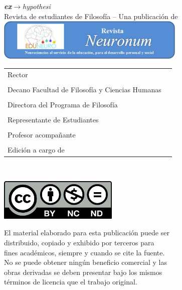 {\small

\begin{center}
	{\Huge\textit{\textcolor{ehAzul1}{\textbf{ex}}\textcolor{ehAzul2}{$\rightarrow$}\textcolor{ehAzul1}{\vspace{-0.4cm}hypothesi}}}\\[0.5cm]
	Revista de estudiantes de Filosofía -- Una publicación de
	\includegraphics[width=9.021cm,height=1.984cm]{img/logo-neuronum.png}
\end{center}

\begin{longtable}[]{@{}ll@{}}
	\toprule[0.5pt]
	\midrule[0.5pt]
	\endhead
	Rector & \rector{}\tabularnewline
	&\tabularnewline
	Decano Facultad de Filosofía y Ciencias Humanas & \decano{}\tabularnewline
	&\tabularnewline
	Directora del Programa de Filosofía & \director{}\tabularnewline
	&\tabularnewline
	Representante de Estudiantes & \representante{}\tabularnewline
	&\tabularnewline
	Profesor acompañante & \profesores{}\tabularnewline
	&\tabularnewline
	Edición a cargo de & \editores{}\tabularnewline
	\bottomrule[0.5pt]
\end{longtable}
\vspace{-2.25em}\hspace{18.7em}\textcolor{white}{La mónada de Leibniz (Dirección espiritual)}
\newpage

\begin{center}
	\includegraphics[width=2.24419in,height=0.78333in]{img/CC-BY-NC-ND.png}
\end{center}

\begin{flushleft}

El material elaborado para esta publicación puede ser\\
distribuido, copiado y exhibido por terceros para\\
fines académicos, siempre y cuando se cite la fuente.\\
No se puede obtener ningún beneficio comercial y las\\
obras derivadas se deben presentar bajo los mismos\\
términos de licencia que el trabajo original.


\end{flushleft}}
